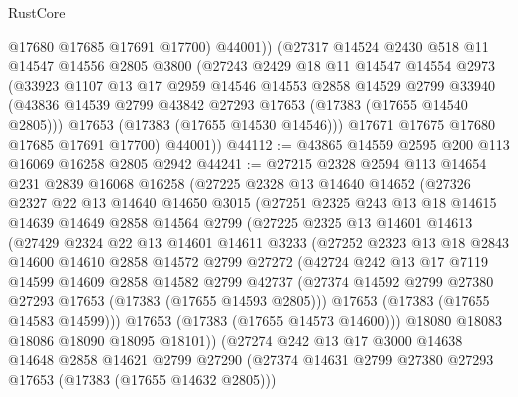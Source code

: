 \begin{lexlean}{RustCore}
\begin{coremodule}
            @17680
            @17685
            @17691
            @17700)
          @44001))
      (@27317
        @14524
        @2430
        @518
        @11
        @14547
        @14556
        @2805
        @3800
        (@27243
          @2429
          @18
          @11
          @14547
          @14554
          @2973
          (@33923
            @1107
            @13
            @17
            @2959
            @14546
            @14553
            @2858
            @14529
            @2799
            @33940
            (@43836 @14539 @2799 @43842 @27293 @17653 (@17383 (@17655 @14540 @2805)))
            @17653
            (@17383 (@17655 @14530 @14546)))
          @17671
          @17675
          @17680
          @17685
          @17691
          @17700)
        @44001))
@44112 := @43865 @14559 @2595 @200 @113 @16069 @16258 @2805 @2942
@44241 := @27215
    @2328
    @2594
    @113
    @14654
    @231
    @2839
    @16068
    @16258
    (@27225
      @2328
      @13
      @14640
      @14652
      (@27326
        @2327
        @22
        @13
        @14640
        @14650
        @3015
        (@27251
          @2325
          @243
          @13
          @18
          @14615
          @14639
          @14649
          @2858
          @14564
          @2799
          (@27225
            @2325
            @13
            @14601
            @14613
            (@27429
              @2324
              @22
              @13
              @14601
              @14611
              @3233
              (@27252
                @2323
                @13
                @18
                @2843
                @14600
                @14610
                @2858
                @14572
                @2799
                @27272
                (@42724
                  @242
                  @13
                  @17
                  @7119
                  @14599
                  @14609
                  @2858
                  @14582
                  @2799
                  @42737
                  (@27374 @14592 @2799 @27380 @27293 @17653 (@17383 (@17655 @14593 @2805)))
                  @17653
                  (@17383 (@17655 @14583 @14599)))
                @17653
                (@17383 (@17655 @14573 @14600)))
              @18080
              @18083
              @18086
              @18090
              @18095
              @18101))
          (@27274
            @242
            @13
            @17
            @3000
            @14638
            @14648
            @2858
            @14621
            @2799
            @27290
            (@27374 @14631 @2799 @27380 @27293 @17653 (@17383 (@17655 @14632 @2805)))

\end{coremodule}
\end{lexlean}
